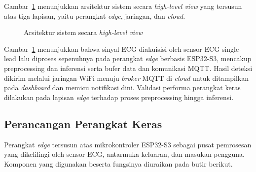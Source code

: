 Gambar~\ref{fig:arsitektur-sistem} menunjukkan arsitektur sistem secara \textit{high-level view} yang tersusun atas tiga lapisan, yaitu perangkat \textit{edge}, jaringan, dan \textit{cloud}.

\begin{figure}[H]
  \centering
  \caption{Arsitektur sistem secara \textit{high-level view}}
  \label{fig:arsitektur-sistem}
\end{figure}

Gambar~\ref{fig:arsitektur-sistem} menunjukkan bahwa sinyal ECG diakuisisi oleh sensor ECG single-lead lalu diproses sepenuhnya pada perangkat \textit{edge} berbasis ESP32-S3, mencakup preprocessing dan inferensi serta bufer data dan komunikasi MQTT. Hasil deteksi dikirim melalui jaringan WiFi menuju \textit{broker} MQTT di \textit{cloud} untuk ditampilkan pada \textit{dashboard} dan memicu notifikasi dini. Validasi performa perangkat keras dilakukan pada lapisan \textit{edge} terhadap proses preprocessing hingga inferensi.

\subsection{Perancangan Perangkat Keras}

Perangkat \textit{edge} tersusun atas mikrokontroler ESP32-S3 sebagai pusat pemrosesan yang dikelilingi oleh sensor ECG, antarmuka keluaran, dan masukan pengguna. Komponen yang digunakan beserta fungsinya diuraikan pada butir berikut.

